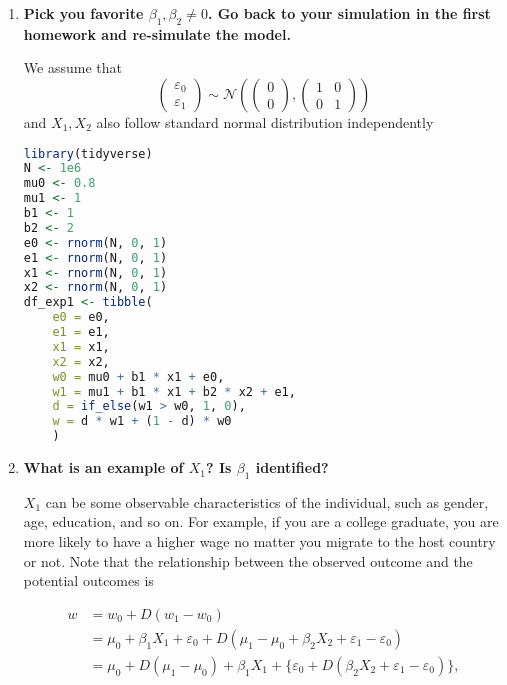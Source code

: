 \documentclass[11pt]{article}
\begin{document}
        \begin{enumerate}

            \item {\bf Pick you favorite $\beta_1, \beta_2 \neq 0$. Go back to your simulation in the first homework and re-simulate the model.}
            
                We assume that
                \[
                    \begin{pmatrix}
                        \varepsilon_0 \\
                        \varepsilon_1
                      \end{pmatrix}
                      \sim \mathcal{N}
                      \left(
                        \begin{pmatrix}
                          0 \\
                          0
                        \end{pmatrix},
                        \begin{pmatrix}
                          1 & 0 \\
                          0 & 1
                        \end{pmatrix}
                      \right)
                \]
                and $X_1, X_2$ also follow standard normal distribution independently
                \begin{lstlisting}[language=R]
library(tidyverse)
N <- 1e6
mu0 <- 0.8
mu1 <- 1
b1 <- 1
b2 <- 2
e0 <- rnorm(N, 0, 1)
e1 <- rnorm(N, 0, 1)
x1 <- rnorm(N, 0, 1)
x2 <- rnorm(N, 0, 1)
df_exp1 <- tibble(
    e0 = e0,
    e1 = e1,
    x1 = x1,
    x2 = x2,
    w0 = mu0 + b1 * x1 + e0,
    w1 = mu1 + b1 * x1 + b2 * x2 + e1,
    d = if_else(w1 > w0, 1, 0),
    w = d * w1 + (1 - d) * w0
    )
                \end{lstlisting}

            \item {\bf What is an example of $X_1$? Is $\beta_1$ identified?}
                
                $X_1$ can be some observable characteristics of the individual, such as gender, age, education, and so on. For example, if you are a college graduate, you are more likely to have a higher wage no matter you migrate to the host country or not. Note that the relationship between the observed outcome and the potential outcomes is

                \[ \begin{aligned}
                    w &= w_0 + D(w_1 - w_0) \\
                      &= \mu_0 + \beta_1 X_1 + \varepsilon_0 + D(\mu_1 - \mu_0 + \beta_2 X_2 + \varepsilon_1 - \varepsilon_0) \\
                      &= \mu_0 + D(\mu_1 - \mu_0) + \beta_1 X_1 + \{ \varepsilon_0 + D(\beta_2 X_2 + \varepsilon_1 - \varepsilon_0) \},
                \end{aligned} \]


\end{enumerate}
\end{document}
